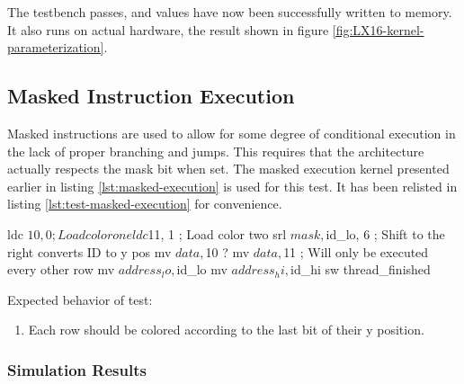 \documentclass[../main/report.tex]{subfiles}
\begin{document}
The testbench passes, and values have now been successfully written to memory.
It also runs on actual hardware, the result shown in figure \ref{fig:LX16-kernel-parameterization}.

\subsection{Masked Instruction Execution}

Masked instructions are used to allow for some degree of conditional execution in the lack of proper branching and jumps.
This requires that the architecture actually respects the mask bit when set.
The masked execution kernel presented earlier in listing \ref{lst:masked-execution} is used for this test.
It has been relisted in listing \ref{lst:test-masked-execution} for convenience.

\begin{assembly}[caption=Conditional execution using predicated instructions, label=lst:test-masked-execution]
ldc $10, 0 ; Load color one
ldc $11, 1 ; Load color two
srl $mask, $id_lo, 6 ; Shift to the right converts ID to y pos
mv $data, $10
? mv $data, $11 ; Will only be executed every other row
mv $address_lo, $id_lo
mv $address_hi, $id_hi
sw
thread_finished
\end{assembly}

Expected behavior of test:
\begin{enumerate}
  \item
    Each row should be colored according to the last bit of their y position.
\end{enumerate}

\subsubsection*{Simulation Results}
\end{document}
